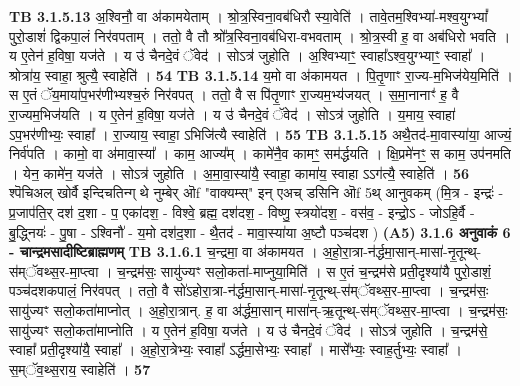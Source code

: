 \documentclass[17pt]{extarticle}
\begin{document}
{{                  \newline
                                \textbf{ TB 3.1.5.13} \newline
                  अ॒श्विनौ॒ वा अ॑कामयेताम् । श्रो॒त्र॒स्विना॒वब॑धिरौ स्या॒वेति॑ । तावे॒तम॒श्विभ्या॑-मश्व॒युग्भ्यां᳚ पुरो॒डाशं॑ द्विकपा॒लं निर॑वपताम् । ततो॒ वै तौ श्रो᳚त्र॒स्विना॒वब॑धिरा-वभवताम् । श्रो॒त्र॒स्वी ह॒ वा अब॑धिरो भवति । य ए॒तेन॑ ह॒विषा॒ यज॑ते । य उ॑ चैनदे॒वं ॅवेद॑ । सोऽत्र॑ जुहोति । अ॒श्विभ्याꣳ॒॒ स्वाहा᳚ऽश्व॒युग्भ्याꣳ॒॒ स्वाहा᳚ । श्रोत्रा॑य॒ स्वाहा॒ श्रुत्यै॒ स्वाहेति॑ । \textbf{ 54} \newline
                  \newline
                                \textbf{ TB 3.1.5.14} \newline
                  य॒मो वा अ॑कामयत । पि॒तृ॒णाꣳ रा॒ज्य-म॒भिज॑येय॒मिति॑ । स ए॒तं ॅय॒माया॑प॒भर॑णीभ्यश्च॒रुं निर॑वपत् । ततो॒ वै स पि॑तृ॒णाꣳ रा॒ज्यम॒भ्य॑जयत् । स॒मा॒नानाꣳ॑ ह॒ वै रा॒ज्यम॒भिज॑यति । य ए॒तेन॑ ह॒विषा॒ यज॑ते । य उ॑ चैनदे॒वं ॅवेद॑ । सोऽत्र॑ जुहोति । य॒माय॒ स्वाहा॑ ऽप॒भर॑णीभ्यः॒ स्वाहा᳚ । रा॒ज्याय॒ स्वाहा॒ ऽभिजि॑त्यै स्वाहेति॑ । \textbf{ 55} \newline
                  \newline
                                \textbf{ TB 3.1.5.15} \newline
                  अथै॒तद॑-मा॒वास्या॑या॒ आज्यं॒ निर्व॑पति । कामो॒ वा अ॑मावा॒स्या᳚ । काम॒ आज्य᳚म् । कामे॑नै॒व कामꣳ॒॒ सम॑र्द्धयति । क्षि॒प्रमे॑नꣳ॒॒ स काम॒ उप॑नमति । येन॒ कामे॑न॒ यज॑ते । सोऽत्र॑ जुहोति । अ॒मा॒वा॒स्या॑यै॒ स्वाहा॒ कामा॑य॒ स्वाहा ऽऽग॑त्यै॒ स्वाहेति॑ । \textbf{ 56} \newline
                  \newline
                                    श्पॆचिअल् खोर्वै इन्दिचतिन्ग् थे नुम्बेर् ऒf "वाक्यम्स्" इन् एअच् डसिनि ऒf 5थ् आनुवकम् (मि॒त्र - इन्द्रः॑ - प्र॒जाप॑ति॒र् दश॑ द॒शा - प॒ एका॑दश॒ - विश्वे॒ ब्रह्म॒ दश॑दश॒ - विष्णु॒ स्त्रयो॑दश॒ - वस॑व॒ - इन्द्रो॒ऽ - जोऽहि॒र्वै - 
बु॒द्ध्नियः॑ - पु॒षा - ऽश्विनौ॑ - य॒मो दश॑द॒शा - थै॒तद॑ - मावा॒स्या॑या अ॒ष्टौ पञ्च॑दश ) \textbf{(A5)} \newline \newline
                \textbf{ 3.1.6     अनुवाकं   6 - चान्द्रमसादीष्टिब्राह्मणम्} \newline
                                \textbf{ TB 3.1.6.1} \newline
                  च॒न्द्रमा॒ वा अ॑कामयत । अ॒हो॒रा॒त्रा-न॑र्द्धमा॒सान्-मासा॑-नृ॒तून्थ्- स॑म्ॅवथ्स॒र-मा॒प्त्वा । च॒न्द्रम॑सः॒ सायु॑ज्यꣳ सलो॒कता॑-माप्नुया॒मिति॑ । स ए॒तं च॒न्द्रम॑से प्रती॒दृश्या॑यै पुरो॒डाशं॒ पञ्च॑दशकपालं॒ निर॑वपत् । ततो॒ वै सो॑ऽहोरा॒त्रा-न॑र्द्धमा॒सान्-मासा॑-नृ॒तून्थ्-स॑म्ॅवथ्स॒र-मा॒प्त्वा । च॒न्द्रम॑सः॒ सायु॑ज्यꣳ सलो॒कता॑माप्नोत् । अ॒हो॒रा॒त्रान्. ह॒ वा अ॑र्द्धमा॒सान् मासा॑न्-ऋ॒तून्थ्-स॑म्ॅवथ्स॒र-मा॒प्त्वा । च॒न्द्रम॑सः॒ सायु॑ज्यꣳ सलो॒कता॑माप्नोति । य ए॒तेन॑ ह॒विषा॒ यज॑ते । य उ॑ चैनदे॒वं ॅवेद॑ । सोऽत्र॑ जुहोति । च॒न्द्रम॑से॒ स्वाहा᳚ प्रती॒दृश्या॑यै॒ स्वाहा᳚ । अ॒हो॒रा॒त्रेभ्यः॒ स्वाहा᳚ ऽर्द्धमा॒सेभ्यः॒ स्वाहा᳚ । मासे᳚भ्यः॒ स्वाह॒र्तुभ्यः॒ स्वाहा᳚ । स॒म्ॅव॒थ्स॒राय॒ स्वाहेति॑ । \textbf{ 57} \newline
}}
\end{document}
